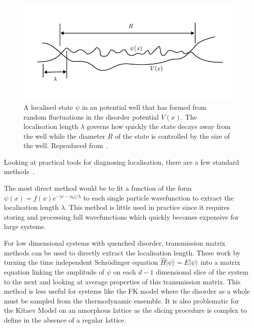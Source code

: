 \hypertarget{fig:localisation_radius_vs_length}{%
\begin{figure}
\centering
\includegraphics[width=1\textwidth,height=\textheight]{figure_code/background_chapter/localisation_radius_vs_length}
\caption[{Localisation length vs diameter}]{A localised state \(\psi\) in an potential well that has formed from random fluctuations in the disorder potential \(V(x)\). The localisation length \(\lambda\) governs how quickly the state decays away from the well while the diameter \(R\) of the state is controlled by the size of the well. Reproduced from~\autocite{kramerLocalizationTheoryExperiment1993}.}
\label{fig:localisation_radius_vs_length}
\end{figure}
}

Looking at practical tools for diagnosing localisation, there are a few standard methods~\autocite{kramerLocalizationTheoryExperiment1993}.

The most direct method would be to fit a function of the form \(\psi(x) = f(x) e^{-|x-x_0|/\lambda}\) to each single particle wavefunction to extract the localisation length \(\lambda\). This method is little used in practice since it requires storing and processing full wavefunctions which quickly becomes expensive for large systems.

For low dimensional systems with quenched disorder, transmission matrix methods can be used to directly extract the localisation length. These work by turning the time independent Schrödinger equation \(\hat{H}|\psi\rangle = E|\psi\rangle\) into a matrix equation linking the amplitude of \(\psi\) on each \(d-1\) dimensional slice of the system to the next and looking at average properties of this transmission matrix. This method is less useful for systems like the FK model where the disorder as a whole must be sampled from the thermodynamic ensemble. It is also problematic for the Kitaev Model on an amorphous lattice as the slicing procedure is complex to define in the absence of a regular lattice.

